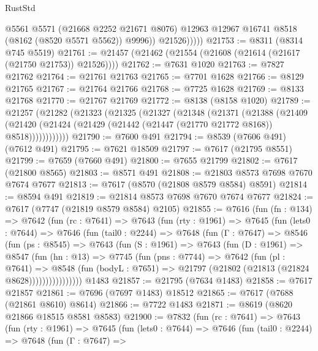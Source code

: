 \begin{lexlean}{RustStd}
\begin{coremodule}
                  @5561
                  @5571
                  (@21668 @2252 @21671 @8076)
                  @12963
                  @12967
                  @16741
                  @8518
                  (@8162 (@8520 @5571 @5562))
                  @9996))
              @21526)))))
@21753 := @8311 (@8314 @745 @5519)
@21761 := @21457 (@21462 (@21554 (@21608 (@21614 (@21617 (@21750 @21753)) @21526))))
@21762 := @7631 @1020
@21763 := @7827 @21762
@21764 := @21761 @21763
@21765 := @7701 @1628
@21766 := @8129 @21765
@21767 := @21764 @21766
@21768 := @7725 @1628
@21769 := @8133 @21768
@21770 := @21767 @21769
@21772 := @8138 (@8158 @1020)
@21789 := @21257
    (@21282
      (@21323
        (@21325
          (@21327
            (@21348
              (@21371
                (@21388
                  (@21409
                    (@21420 (@21424 (@21429 (@21442 (@21447 (@21770 @21772 @8168)) @8518))))))))))))
@21790 := @7600 @491
@21794 := @8539 (@7606 @491) (@7612 @491)
@21795 := @7621 @18509
@21797 := @7617 (@21795 @8551)
@21799 := @7659 (@7660 @491)
@21800 := @7655 @21799
@21802 := @7617 (@21800 @8565)
@21803 := @8571 @491
@21808 := @21803 @8573 @7698 @7670 @7674 @7677
@21813 := @7617 (@8570 (@21808 @8579 @8584) @8591)
@21814 := @8594 @491
@21819 := @21814 @8573 @7698 @7670 @7674 @7677
@21824 := @7617 (@7747 (@21819 @8579 @8584) @2105)
@21855 := @7616
    (fun (fn : @134) =>
    @7642
      (fun (rc : @7641) =>
      @7643
        (fun (rty : @1961) =>
        @7645
          (fun (lets0 : @7644) =>
          @7646
            (fun (tail0 : @2244) =>
            @7648
              (fun (Γ : @7647) =>
              @8546
                (fun (ps : @8545) =>
                @7643
                  (fun (S : @1961) =>
                  @7643
                    (fun (D : @1961) =>
                    @8547
                      (fun (hn : @13) =>
                      @7745
                        (fun (pns : @7744) =>
                        @7642
                          (fun (pl : @7641) =>
                          @8548
                            (fun (bodyL : @7651) =>
                            @21797 (@21802 (@21813 (@21824 @8628))))))))))))))))
    @1483
@21857 := @21795 (@7634 @1483)
@21858 := @7617 @21857
@21861 := @7696 (@7697 @1483) @18512
@21865 := @7617 (@7688 (@21861 @8610) @8614)
@21866 := @7722 @1483
@21871 := @8619 (@8620 @21866 @18515 @8581 @8583)
@21900 := @7832
    (fun (rc : @7641) =>
    @7643
      (fun (rty : @1961) =>
      @7645
        (fun (lets0 : @7644) =>
        @7646
          (fun (tail0 : @2244) =>
          @7648
            (fun (Γ : @7647) =>

\end{coremodule}
\end{lexlean}
